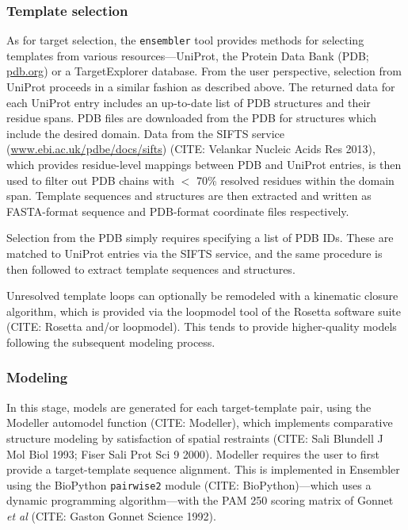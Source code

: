 \documentclass[aps,pre,twocolumn,nofootinbib,superscriptaddress,linenumbers]{revtex4-1}
\begin{document}

\subsubsection{Template selection}

As for target selection, the {\tt ensembler} tool provides methods for selecting templates from various resources---UniProt, the Protein Data Bank (PDB; \href{http://www.pdb.org}{pdb.org}) or a TargetExplorer database.
From the user perspective, selection from UniProt proceeds in a similar fashion as described above.
The returned data for each UniProt entry includes an up-to-date list of PDB structures and their residue spans.
PDB files are downloaded from the PDB for structures which include the desired domain.
Data from the SIFTS service (\href{http://www.ebi.ac.uk/pdbe/docs/sifts/}{www.ebi.ac.uk/pdbe/docs/sifts}) (CITE: Velankar Nucleic Acids Res 2013), which provides residue-level mappings between PDB and UniProt entries, is then used to filter out PDB chains with $<$ 70\% resolved residues within the domain span.
Template sequences and structures are then extracted and written as FASTA-format sequence and PDB-format coordinate files respectively.

Selection from the PDB simply requires specifying a list of PDB IDs.
These are matched to UniProt entries via the SIFTS service, and the same procedure is then followed to extract template sequences and structures.

Unresolved template loops can optionally be remodeled with a kinematic closure algorithm, which is provided via the loopmodel tool of the Rosetta software suite (CITE: Rosetta and/or loopmodel).
This tends to provide higher-quality models following the subsequent modeling process.

\subsubsection{Modeling}

In this stage, models are generated for each target-template pair, using the Modeller automodel function (CITE: Modeller), which implements comparative structure modeling by satisfaction of spatial restraints (CITE: Sali Blundell J Mol Biol 1993; Fiser Sali Prot Sci 9 2000).
Modeller requires the user to first provide a target-template sequence alignment.
This is implemented in Ensembler using the BioPython {\tt pairwise2} module (CITE: BioPython)---which uses a dynamic programming algorithm---with the PAM 250 scoring matrix of Gonnet \textit{et al} (CITE: Gaston Gonnet Science 1992).
\end{document}
